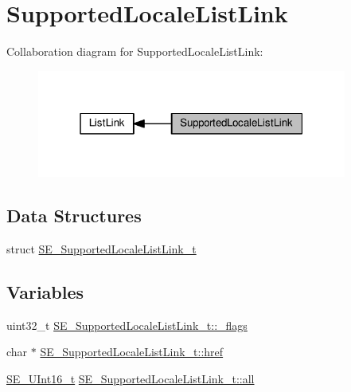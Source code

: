 \hypertarget{group__SupportedLocaleListLink}{}\section{Supported\+Locale\+List\+Link}
\label{group__SupportedLocaleListLink}
Collaboration diagram for Supported\+Locale\+List\+Link\+:\nopagebreak
\begin{figure}[H]
\begin{center}
\leavevmode
\includegraphics[width=289pt]{group__SupportedLocaleListLink}
\end{center}
\end{figure}
\subsection*{Data Structures}
\begin{DoxyCompactItemize}
\item 
struct \hyperlink{structSE__SupportedLocaleListLink__t}{S\+E\+\_\+\+Supported\+Locale\+List\+Link\+\_\+t}
\end{DoxyCompactItemize}
\subsection*{Variables}
\begin{DoxyCompactItemize}
\item 
uint32\+\_\+t \hyperlink{group__SupportedLocaleListLink_ga3834213a35449a295bdcda6fe2864998}{S\+E\+\_\+\+Supported\+Locale\+List\+Link\+\_\+t\+::\+\_\+flags}
\item 
char $\ast$ \hyperlink{group__SupportedLocaleListLink_ga14a01b4c6119f255705a6f237cb8052b}{S\+E\+\_\+\+Supported\+Locale\+List\+Link\+\_\+t\+::href}
\item 
\hyperlink{group__UInt16_gac68d541f189538bfd30cfaa712d20d29}{S\+E\+\_\+\+U\+Int16\+\_\+t} \hyperlink{group__SupportedLocaleListLink_gab0c9ec69f7f20c53bc6b52d30fde20f1}{S\+E\+\_\+\+Supported\+Locale\+List\+Link\+\_\+t\+::all}
\end{DoxyCompactItemize}


